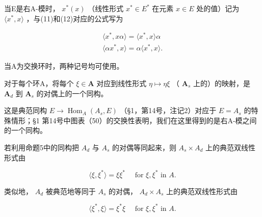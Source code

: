 当E是右A-模时， \(x^{*}(x)\) （线性形式 \(x^{*} \in E^{*}\) 在元素 \(x \in E\) 处的值）记为 \(\langle x^{*}, x \rangle\) ，与(11)和(12)对应的公式写为

\[
\begin{array}{l} \langle x ^ {*}, x \alpha \rangle = \langle x ^ {*}, x \rangle \alpha \\ \langle \alpha x ^ {*}, x \rangle = \alpha \langle x ^ {*}, x \rangle . \end{array}
\]

当A为交换环时，两种记号均可使用。

对于每个环A，将每个 \(\xi\in\mathbf{A}\) 对应到线性形式 \(\eta\mapsto\eta\xi\) （ \(\mathbf{A}_{s}\) 上的）的映射，是 \(\mathbf{A}_{d}\) 到 \(\mathbf{A}_{s}\) 的对偶上的一个同构。

这是典范同构 \(E \to \operatorname{Hom}_{A}(A_{s}, E)\) （§1，第14号，注记2）对应于 \(E = A_{s}\) 的特殊情形；§1 第14号中图表（50）的交换性表明，我们在这里得到的是右A-模之间的一个同构。

若利用命题5中的同构把 \(A_{d}\) 与 \(A_{s}\) 的对偶等同起来，则 \(A_{s} \times A_{d}\) 上的典范双线性形式由

\[
\langle \xi , \xi^ {*} \rangle = \xi \xi^ {*} \quad \text { for } \xi , \xi^ {*} \text { in } A.\tag{13}
\]

类似地， \(A_{d}\) 被典范地等同于 \(A_{s}\) 的对偶， \(A_{d} \times A_{s}\) 上的典范双线性形式由

\[
\langle \xi^ {*}, \xi \rangle = \xi^ {*} \xi \quad \text { for } \xi , \xi^ {*} \text { in } A.\tag{14}
\]

